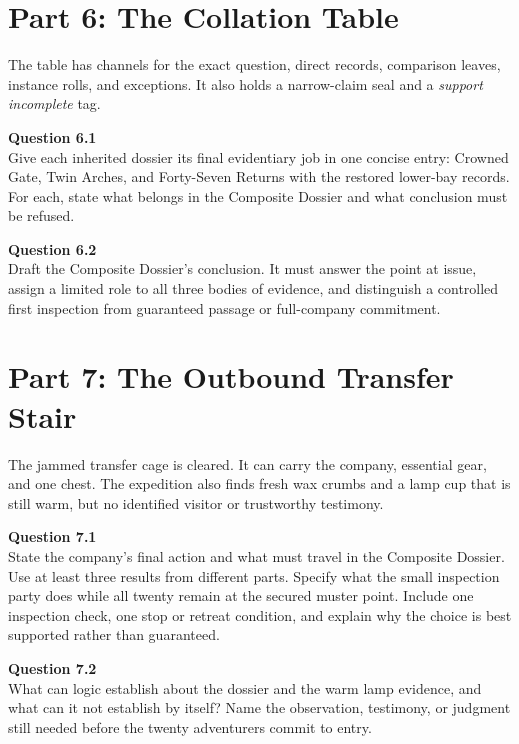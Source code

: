 \documentclass[12pt]{article}
\begin{document}
\newpage
\section*{Part 6: The Collation Table}
The table has channels for the exact question, direct records, comparison leaves, instance rolls, and exceptions. It also holds a narrow-claim seal and a \emph{support incomplete} tag.

\textbf{Question 6.1}\\[-0.15em]
Give each inherited dossier its final evidentiary job in one concise entry: Crowned Gate, Twin Arches, and Forty-Seven Returns with the restored lower-bay records. For each, state what belongs in the Composite Dossier and what conclusion must be refused.

\textbf{Question 6.2}\\[-0.15em]
Draft the Composite Dossier's conclusion. It must answer the point at issue, assign a limited role to all three bodies of evidence, and distinguish a controlled first inspection from guaranteed passage or full-company commitment.

\newpage
\section*{Part 7: The Outbound Transfer Stair}
The jammed transfer cage is cleared. It can carry the company, essential gear, and one chest. The expedition also finds fresh wax crumbs and a lamp cup that is still warm, but no identified visitor or trustworthy testimony.

\textbf{Question 7.1}\\[-0.15em]
State the company's final action and what must travel in the Composite Dossier. Use at least three results from different parts. Specify what the small inspection party does while all twenty remain at the secured muster point. Include one inspection check, one stop or retreat condition, and explain why the choice is best supported rather than guaranteed.

\textbf{Question 7.2}\\[-0.15em]
What can logic establish about the dossier and the warm lamp evidence, and what can it not establish by itself? Name the observation, testimony, or judgment still needed before the twenty adventurers commit to entry.
\end{document}
